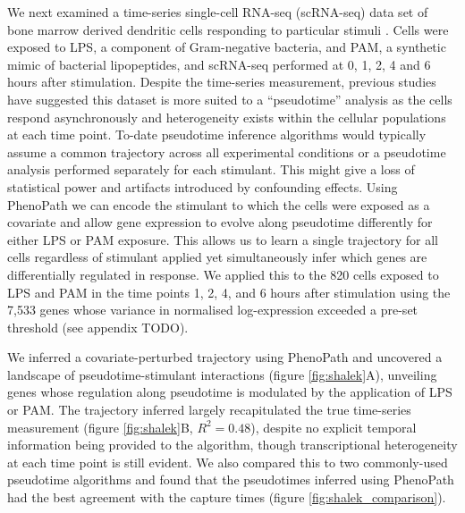 We next examined a time-series single-cell RNA-seq (scRNA-seq) data set of bone marrow derived dendritic cells responding to particular stimuli \cite{Shalek2014-cg}. Cells were exposed to LPS, a component of Gram-negative bacteria, and PAM, a synthetic mimic of bacterial lipopeptides, and scRNA-seq performed at 0, 1, 2, 4 and 6 hours after stimulation. Despite the time-series measurement, previous studies have suggested this dataset is more suited to a ``pseudotime'' analysis as the cells respond asynchronously and heterogeneity exists within the cellular populations at each time point\cite{Reid2016-yo}. To-date pseudotime inference algorithms would typically assume a common trajectory across all experimental conditions or a pseudotime analysis  performed separately for each stimulant. This might give a loss of statistical power and artifacts introduced by confounding effects. Using PhenoPath we can encode the stimulant to which the cells were exposed as a covariate and allow gene expression to evolve along pseudotime differently for either LPS or PAM exposure. This allows us to learn a single trajectory for all cells regardless of stimulant applied yet simultaneously infer which genes are differentially regulated in response. We applied this to the 820 cells exposed to LPS and PAM in the time points 1, 2, 4, and 6 hours after stimulation using the 7,533 genes whose variance in normalised log-expression exceeded a pre-set threshold (see appendix TODO).

We inferred a covariate-perturbed trajectory using PhenoPath and uncovered a landscape of pseudotime-stimulant interactions (figure \ref{fig:shalek}A), unveiling genes whose regulation along pseudotime is modulated by the application of LPS or PAM. The trajectory inferred largely recapitulated the true time-series measurement (figure \ref{fig:shalek}B, $R^2 = 0.48$), despite no explicit temporal information being provided to the algorithm, though transcriptional heterogeneity at each time point is still evident. We also compared this to two commonly-used pseudotime algorithms and found that the pseudotimes inferred using PhenoPath had the best agreement with the capture times (figure \ref{fig:shalek_comparison}).


